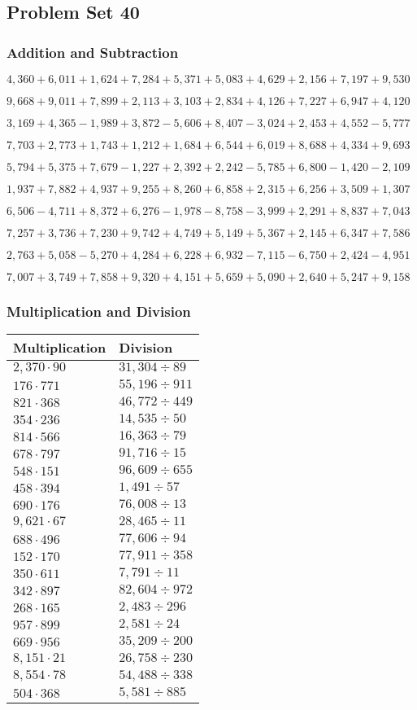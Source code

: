 \hypertarget{problem-set-40-3}{%
\subsection{Problem Set 40}\label{problem-set-40-3}}

\hypertarget{addition-and-subtraction-202}{%
\subsubsection{Addition and
Subtraction}\label{addition-and-subtraction-202}}

\(4,360+6,011+1,624+7,284+5,371+5,083+4,629+2,156+7,197+ 9,530\)

\(9,668+9,011+7,899+2,113+3,103+2,834+4,126+7,227+6,947+4,120\)

\(3,169+4,365-1,989+3,872-5,606+8,407-3,024+2,453+4,552-5,777\)

\(7,703+2,773+1,743+1,212+1,684+6,544+6,019+8,688+4,334+9,693\)

\(5,794+5,375+7,679-1,227+2,392+2,242-5,785+6,800-1,420-2,109\)

\(1,937+7,882+4,937+9,255+8,260+6,858+2,315+6,256+3,509+1,307\)

\(6,506-4,711+8,372+6,276-1,978-8,758-3,999+2,291+8,837+7,043\)

\(7,257+3,736+7,230+9,742+4,749+5,149+5,367+2,145+6,347+7,586\)

\(2,763+5,058-5,270+4,284+6,228+6,932-7,115-6,750+2,424-4,951\)

\(7,007+3,749+7,858+9,320+4,151+5,659+5,090+2,640+5,247+9,158\)

\hypertarget{multiplication-and-division-201}{%
\subsubsection{Multiplication and
Division}\label{multiplication-and-division-201}}

\begin{longtable}[]{@{}ll@{}}
\toprule
Multiplication & Division\tabularnewline
\midrule
\endhead
\(2,370\cdot90\) & \(31,304÷89\)\tabularnewline
\(176\cdot771\) & \(55,196÷911\)\tabularnewline
\(821\cdot368\) & \(46,772÷449\)\tabularnewline
\(354\cdot236\) & \(14,535÷50\)\tabularnewline
\(814\cdot566\) & \(16,363÷79\)\tabularnewline
\(678\cdot797\) & \(91,716÷15\)\tabularnewline
\(548\cdot151\) & \(96,609÷655\)\tabularnewline
\(458\cdot394\) & \(1,491÷57\)\tabularnewline
\(690\cdot176\) & \(76,008÷13\)\tabularnewline
\(9,621\cdot67\) & \(28,465÷11\)\tabularnewline
\(688\cdot496\) & \(77,606÷94\)\tabularnewline
\(152\cdot170\) & \(77,911÷358\)\tabularnewline
\(350\cdot611\) & \(7,791÷11\)\tabularnewline
\(342\cdot897\) & \(82,604÷972\)\tabularnewline
\(268\cdot165\) & \(2,483÷296\)\tabularnewline
\(957\cdot899\) & \(2,581÷24\)\tabularnewline
\(669\cdot956\) & \(35,209÷200\)\tabularnewline
\(8,151\cdot21\) & \(26,758÷230\)\tabularnewline
\(8,554\cdot78\) & \(54,488÷338\)\tabularnewline
\(504\cdot368\) & \(5,581÷885\)\tabularnewline
\bottomrule
\end{longtable}

